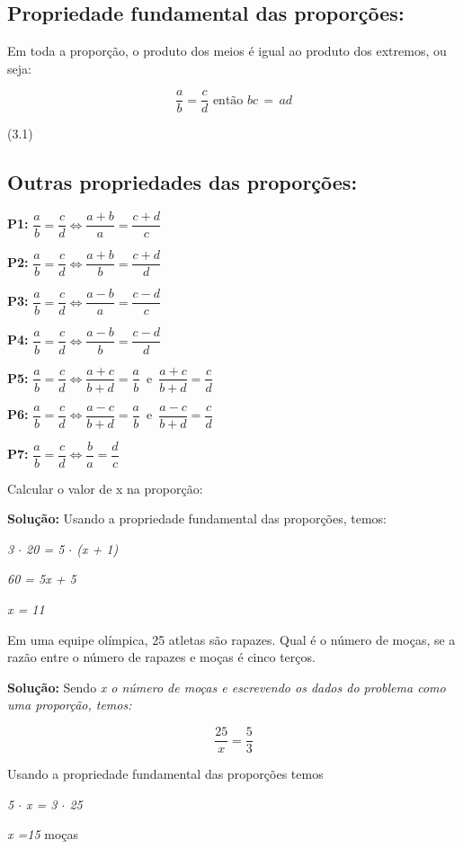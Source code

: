 \subsection{Propriedade fundamental das proporções:}

Em toda a proporção, o produto dos meios é igual ao produto dos extremos, ou seja:

$$\dfrac{a}{b}=\dfrac{c}{d} \textrm{ então } bc \, = \, ad$$
\begin{FlushRight}
(3.1)
\end{FlushRight}

\subsection{Outras propriedades das proporções:}

\textbf{P1:} $\dfrac{a}{b}=\dfrac{c}{d} \Longleftrightarrow \dfrac{a+b}{a}=\dfrac{c+d}{c}$

\textbf{P2:} $\dfrac{a}{b}=\dfrac{c}{d} \Longleftrightarrow \dfrac{a+b}{b}=\dfrac{c+d}{d}$

\textbf{P3:} $\dfrac{a}{b}=\dfrac{c}{d} \Longleftrightarrow \dfrac{a-b}{a}=\dfrac{c-d}{c}$

\textbf{P4:} $\dfrac{a}{b}=\dfrac{c}{d} \Longleftrightarrow \dfrac{a-b}{b}=\dfrac{c-d}{d}$

\textbf{P5:} $\dfrac{a}{b}=\dfrac{c}{d} \Longleftrightarrow \dfrac{a+c}{b+d}=\dfrac{a}{b}\,$ e $\,\dfrac{a+c}{b+d}=\dfrac{c}{d}$

\textbf{P6:} $\dfrac{a}{b}=\dfrac{c}{d} \Longleftrightarrow \dfrac{a-c}{b+d}=\dfrac{a}{b}\,$ e $\,\dfrac{a-c}{b+d}=\dfrac{c}{d}$

\textbf{P7:} $\dfrac{a}{b}=\dfrac{c}{d} \Longleftrightarrow \dfrac{b}{a}=\dfrac{d}{c}$

\begin{texemplo}
	Calcular o valor de x na proporção:

	\textbf{Solução: }Usando a propriedade fundamental das proporções, temos:

	\textit{3 $ \cdot $  20 = 5 $ \cdot $  (x + 1)}

	\textit{60 = 5x + 5}

	\textit{x = 11}\qedsymbol{}
\end{texemplo}

\begin{texemplo}
	Em uma equipe olímpica, 25 atletas são rapazes. Qual é o número de moças, se a razão entre o número de rapazes e moças é cinco terços.

	\textbf{Solução:} Sendo \textit{x o número de moças e escrevendo os dados do problema como uma proporção, temos:}

	\[ \frac{25}{x}=\frac{5}{3} \] 

	\quad Usando a propriedade fundamental das proporções temos 

	\textit{5 $ \cdot $  x = 3 $ \cdot $  25 }

	\textit{x =15 }moças\textit{ }\qedsymbol{}
\end{texemplo}

